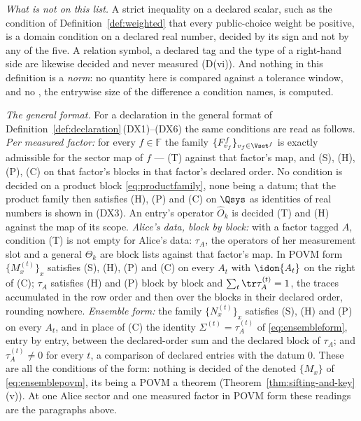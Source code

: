 \begin{definition}
\emph{What is not on this list.} A strict inequality on a declared scalar,
such as the condition of Definition~\ref{def:weighted} that every
public-choice weight be positive, is a domain condition on a declared real
number, decided by its sign and not by any of the five. A relation symbol, a
declared tag and the type of a right-hand side are likewise decided and never
measured (D(vi)). And nothing in this definition is a \emph{norm}: no
quantity here is compared against a tolerance window, and no
, the entrywise size of the difference a condition
names, is computed.

\emph{The general format.} For a declaration in the general format of
Definition~\ref{def:declaration}\,(DX1)--(DX6) the same conditions are read
as follows. \emph{Per measured factor:} for every $f\in\mathbb{F}$ the
family $\{F^{f}_{v_f}\}_{v_f\in\Vset^{f}}$ is exactly admissible for the
sector map of $f$ --- (T) against that factor's map, and (S), (H), (P), (C)
on that factor's blocks in that factor's declared order. No condition is
decided on a product block \eqref{eq:productfamily}, none being a datum; that
the product family then satisfies (H), (P) and (C) on $\Qsys$ as identities
of real numbers is shown in (DX3). An entry's operator $\hat O_k$ is decided
(T) and (H) against the map of its scope. \emph{Alice's data, block by
block:} with a factor tagged $A$, condition (T) is not empty for Alice's
data: $\tau_A$, the operators of her measurement slot and a general
$\Theta_k$ are block lists against that factor's map. In POVM form
$\{M^{(t)}_x\}_x$ satisfies (S), (H), (P) and (C) on every $A_t$ with
$\idon{A_t}$ on the right of (C); $\tau_A$ satisfies (H) and (P) block by
block and $\sum_t\tr\tau^{(t)}_A=1$, the traces accumulated in the row order
and then over the blocks in their declared order, rounding nowhere.
\emph{Ensemble form:} the family $\{N^{(t)}_x\}_x$ satisfies (S), (H) and
(P) on every $A_t$, and in place of (C) the identity
$\Sigma^{(t)}=\tau^{(t)}_A$ of \eqref{eq:ensembleform}, entry by entry,
between the declared-order sum and the declared block of $\tau_A$; and
$\tau^{(t)}_A\ne0$ for every $t$, a comparison of declared entries with the
datum $0$. These are all the conditions of the form: nothing is decided of
the denoted $\{M_x\}$ of \eqref{eq:ensemblepovm}, its being a POVM a theorem
(Theorem~\ref{thm:sifting-and-key}\,(v)). At one Alice sector and one measured factor in
POVM form these readings are the paragraphs above.
\end{definition}
